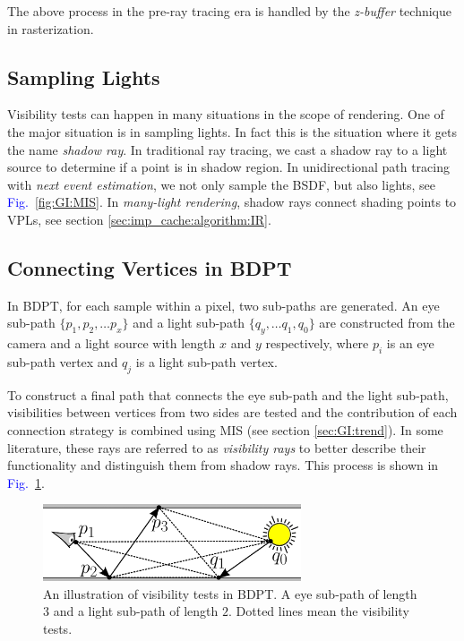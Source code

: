 \documentclass[]{book}
\renewcommand{\figurename}{\textcolor{blue}{Fig.\ }}
\begin{document}
The above process in the pre-ray tracing era is handled by the \textit{z-buffer} technique in rasterization.

\subsection{Sampling Lights}
\label{sec:VC:vTerm:sampleLight}
Visibility tests can happen in many situations in the scope of rendering.
One of the major situation is in sampling lights.
In fact this is the situation where it gets the name \textit{shadow ray}.
In traditional ray tracing, we cast a shadow ray to a light source to determine if a point is in shadow region.
In unidirectional path tracing with \textit{next event estimation}, we not only sample the BSDF, but also lights, see \figurename \ref{fig:GI:MIS}.
In \textit{many-light rendering}, shadow rays connect shading points to VPLs, see section \ref{sec:imp_cache:algorithm:IR}.

\subsection{Connecting Vertices in BDPT}
\label{sec:VC:vTerm:BDPT}
In BDPT, for each sample within a pixel, two sub-paths are generated.
An eye sub-path $\{p_1, p_2, \dots p_x\}$ and a light sub-path $\{q_y, \dots q_1, q_0\}$ are constructed from the camera and a light source with length $x$ and $y$ respectively, where $p_i$ is an eye sub-path vertex and $q_j$ is a light sub-path vertex.

To construct a final path that connects the eye sub-path and the light sub-path, visibilities between vertices from two sides are tested and the contribution of each connection strategy is combined using MIS (see section \ref{sec:GI:trend}).
In some literature, these rays are referred to as \textit{visibility rays} to better describe their functionality and distinguish them from shadow rays.
This process is shown in \figurename \ref{fig:VC:visTest:bdpt}.

\begin{figure}
	\centering
	\includegraphics[width=3.0in]{img/VC-1-BDPT.png}
	\caption[Visibility Tests in BDPT]{An illustration of visibility tests in BDPT. A eye sub-path of length $3$ and a light sub-path of length $2$. Dotted lines mean the visibility tests.}
	\label{fig:VC:visTest:bdpt}
\end{figure}
\end{document}
